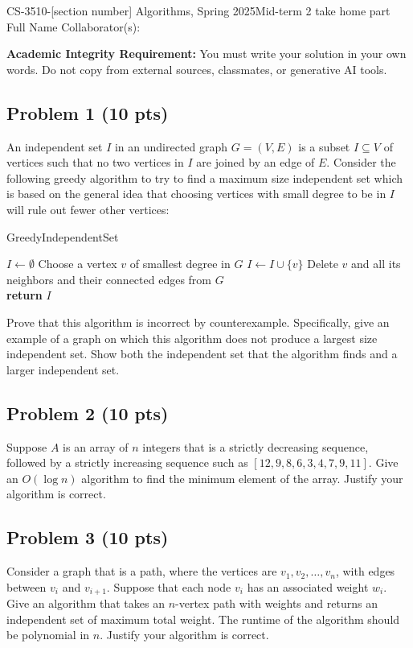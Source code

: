 \documentclass[12pt]{article}
\begin{document}
\noindent CS-3510-[section number] Algorithms, Spring 2025\hfill Mid-term 2 take home part\\
Full Name \hfill Collaborator(s):

\hrulefill

\textbf{Academic Integrity Requirement:} You must write your solution in your own words. Do not copy from external sources, classmates, or generative AI tools.

\subsection*{Problem 1 (10 pts)}

An independent set $I$ in an undirected graph $G = (V, E)$ is a subset $I \subseteq V$ of vertices such that no two vertices in $I$ are joined by an edge of $E$. Consider the following greedy algorithm to try to find a maximum size independent set which is based on the general idea that choosing vertices with small degree to be in $I$ will rule out fewer other vertices:

\begin{algorithm}
\caption{GreedyIndependentSet}
\begin{algorithmic}[1]
\State $I \gets \emptyset$
    \State Choose a vertex $v$ of smallest degree in $G$ 
    \State $I \gets I \cup \{v\}$
    \State Delete $v$ and all its neighbors and their connected edges from $G$\\
\EndWhile
\State \textbf{return} $I$
\end{algorithmic}
\end{algorithm}

Prove that this algorithm is incorrect by counterexample. Specifically, give an example of a graph on which this algorithm does not produce a largest size independent set. Show both the independent set that the algorithm finds and a larger independent set.

\subsection*{Problem 2 (10 pts)}
Suppose $A$ is an array of $n$ integers that is a strictly decreasing sequence, followed by a strictly increasing sequence such as $[12, 9, 8, 6, 3, 4, 7, 9, 11]$. Give an $O(\log n)$ algorithm to find the minimum element of the array. Justify your algorithm is correct.

\subsection*{Problem 3 (10 pts)}
Consider a graph that is a path, where the vertices are $v_1, v_2, \ldots, v_n$, with edges between $v_i$ and $v_{i+1}$. Suppose that each node $v_i$ has an associated weight $w_i$. Give an algorithm that takes an $n$-vertex path with weights and returns an independent set of maximum total weight. The runtime of the algorithm should be polynomial in $n$. Justify your algorithm is correct.
\end{document}
